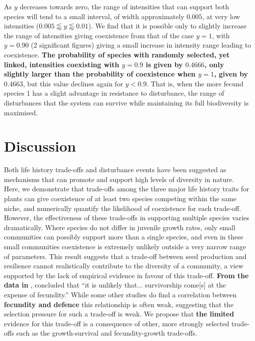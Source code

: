 As $y$ decreases towards zero, the range of intensities that can support both species will tend to a small interval, of width approximately $0.005$, at very low intensities ($0.005\lessapprox y \lessapprox 0.01$). We find that it is possible only to slightly increase the range of intensities giving coexistence from that of the case $y=1$, with $y=0.90$ (2 significant figures) giving a small increase in intensity range leading to coexistence. \textbf{The probability of species with randomly selected, yet linked, intensities coexisting with $y=0.9$ is given by $0.4666$, only slightly larger than the probability of coexistence when $y=1$, given by $0.4663$}, but this value declines again for $y<0.9$. That is, when the more fecund species 1 has a slight advantage in resistance to disturbance, the range of disturbances that the system can survive while maintaining its full biodiversity is maximised.

\section{Discussion}
Both life history trade-offs and disturbance events have been suggested as mechanisms that can promote and support high levels of diversity in nature. Here, we demonstrate that trade-offs among the three major life history traits for plants can give coexistence of at least two species competing within the same niche, and numerically quantify the likelihood of coexistence for each trade-off. However, the effectiveness of these trade-offs in supporting multiple species varies dramatically. Where species do not differ in juvenile growth rates, only small communities can possibly support more than a single species, and even in these small communities coexistence is extremely unlikely outside a very narrow range of parameters. This result suggests that a trade-off between seed production and resilience cannot realistically contribute to the diversity of a community, a view supported by the lack of empirical evidence in favour of this trade-off. \textbf{From the data in} \cite{martin2010dispersal}, \cite{martin2010divergence} concluded that ``it is unlikely that... survivorship come[s] at the expense of fecundity.'' While some other studies do find a correlation between \textbf{fecundity and defence} \citep[e.g.][]{marquis1984leaf,gwynn2005resistance} this relationship is often weak, suggesting that the selection pressure for such a trade-off is weak. We propose that \textbf{the limited} evidence for this trade-off is a consequence of other, more strongly selected trade-offs such as the growth-survival and fecundity-growth trade-offs.

